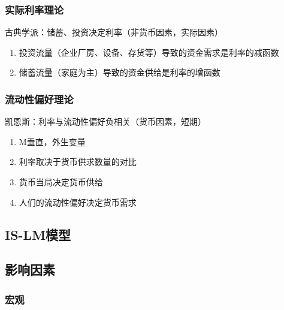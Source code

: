 \documentclass[12pt]{book}
\begin{document}
\subsubsection{实际利率理论}

古典学派：储蓄、投资决定利率（非货币因素，实际因素）

\begin{enumerate}[1.]
    \item 投资流量（企业厂房、设备、存货等）导致的资金需求是利率的减函数
    \item 储蓄流量（家庭为主）导致的资金供给是利率的增函数
\end{enumerate}

\subsubsection{流动性偏好理论}

凯恩斯：利率与流动性偏好负相关（货币因素，短期）

\begin{enumerate}[1.]
    \item M垂直，外生变量
    \item 利率取决于货币供求数量的对比
    \item 货币当局决定货币供给
    \item 人们的流动性偏好决定货币需求
\end{enumerate}



\subsection{IS-LM模型}

\subsection{影响因素}

\subsubsection{宏观}
\end{document}
